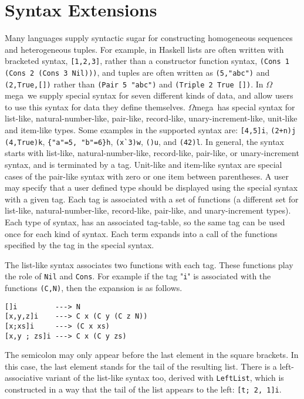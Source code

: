 \documentclass[11pt,twoside]{article}
\newcommand{\om}{$\Omega$mega}
\begin{document}
\section{Syntax Extensions} \label{synext}

Many languages supply syntactic sugar for constructing homogeneous sequences and
heterogeneous tuples. For example, in Haskell lists are often
written with bracketed syntax, \verb+[1,2,3]+, rather than a constructor function syntax, \verb+(Cons 1 (Cons 2 (Cons 3 Nil)))+, and
tuples are often written as \verb+(5,"abc")+ and \verb+(2,True,[])+
rather than \verb+(Pair 5 "abc")+ and \verb+(Triple 2 True [])+. In \om\
we supply special syntax for seven different kinds of data, and allow users to
use this syntax for data they define themselves. \om\ has
special syntax for list-like, natural-number-like, pair-like, record-like,
unary-increment-like, unit-like and item-like types.
Some examples in the supported syntax are: \verb+[4,5]i+, \verb|(2+n)j|
\verb+(4,True)k+, \verb+{"a"=5, "b"=6}h+, \verb+(x`3)w+, \verb+()u+, and \verb+(42)l+.
In general, the syntax starts with list-like, natural-number-like, record-like, pair-like,
or unary-increment syntax, and is terminated by a tag. Unit-like and item-like syntax are
special cases of the pair-like syntax with zero or one item between parentheses. A user
may specify that a user defined type should be displayed using the special syntax with
a given tag. Each tag is associated with a set of functions (a different set for
list-like, natural-number-like, record-like, pair-like, and unary-increment types). 
Each type of syntax, has an associated tag-table, so the same tag can be used once for
each kind of syntax. Each term expands into a call of the functions specified by the
tag in the special syntax.

The list-like syntax associates two functions with each
tag. These functions play the role of {\tt Nil} and {\tt Cons}.
For example if the tag "{\tt i}" is associated with
the functions {\tt (C,N)}, then the expansion is as follows.
\begin{verbatim}
[]i         ---> N
[x,y,z]i    ---> C x (C y (C z N))
[x;xs]i     ---> (C x xs)
[x,y ; zs]i ---> C x (C y zs)
\end{verbatim}
\noindent
The semicolon may only appear before the last element in the square brackets.
In this case, the last element stands for the tail of the resulting list. There
is a left-associative variant of the list-like syntax too, derived with \verb+LeftList+,
which is constructed in a way that the tail of the list appears to the left: \verb+[t; 2, 1]i+.
\end{document}
